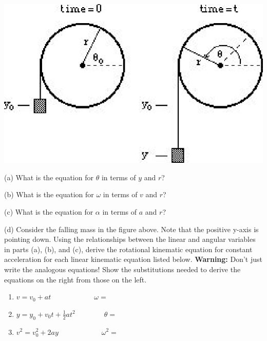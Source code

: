 \vspace{0.3cm}
{\par\centering \includegraphics{rotation/rotation_fig9.eps} \par}
\vspace{0.3cm}

(a) What is the equation for \( \theta  \) in terms of $y$ and $r$?
\vspace{10mm}

(b) What is the equation for \( \omega  \) in terms of $v$ and $r$?
\vspace{10mm}

(c) What is the equation for \( \alpha  \) in terms of $a$ and $r$?
\vspace{10mm}

(d) Consider the falling mass in the figure above. Note that the positive 
y-axis is pointing down. Using the 
relationships between the linear and angular variables in parts (a), (b), and 
(c), derive the rotational kinematic equation for constant acceleration for 
each linear kinematic equation listed below. \textbf{Warning:} Don't just write
the analogous equations! Show the substitutions needed to derive the equations
on the right from those on the left.

\begin{enumerate}
\item \( v=v_{0}+at\qquad \qquad \qquad \omega = \)\vspace{20mm}

\item \( y=y_{0}+v_{0}t+\frac{1}{2}at^{2}\qquad \qquad \theta = \)\vspace{20mm}

\item \( v^{2}=v_{0}^{2}+2ay\qquad \qquad \qquad \omega ^{2}= \)
\end{enumerate}
